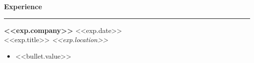 \documentclass[10pt]{article}
\newcommand{\cvsection}[1]{%
  \vspace{7pt}%
  {\large\bf #1}%
  \vspace{2pt}%
  \hrule%
  \vspace{5pt}%
}
\newcommand{\tagged}[2]{\hypertarget{#1}{#2}}
\begin{document}
\begin{tcolorbox}

\vspace{8pt}
\cvsection{Experience}
{\fontsize{10}{13}\bf \tagged{<<exp.id>>_company}{<<exp.company>>}} \hfill {\fontsize{8.5}{11}\selectfont \tagged{<<exp.id>>_date}{<<exp.date>>}} \\[-1pt]
{\fontsize{9}{12}\selectfont \tagged{<<exp.id>>_title}{<<exp.title>>}} \hfill {\fontsize{8.5}{11}\selectfont\textit{\tagged{<<exp.id>>_location}{<<exp.location>>}}}
\vspace{1pt}
{\fontsize{8.5}{12}\selectfont
\begin{itemize}[leftmargin=1.2em, noitemsep, topsep=1pt, parsep=0pt]
  \item \tagged{<<bullet.id>>}{<<bullet.value>>}
\end{itemize}
}
\vspace{5pt}

\end{tcolorbox}
\end{document}

